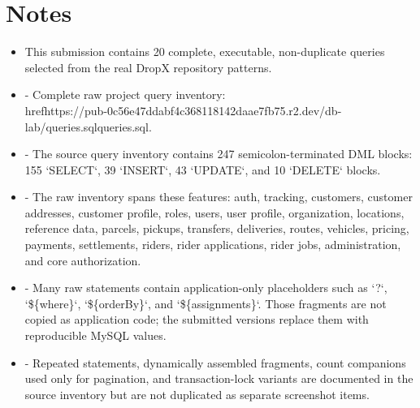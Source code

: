 \documentclass[11pt,a4paper]{article}
\begin{document}
\section{Notes}
\begin{itemize}
\item This submission contains 20 complete, executable, non-duplicate queries selected from the real DropX repository patterns.
\item - Complete raw project query inventory: \\href{https://pub-0c56e47ddabf4c368118142daae7fb75.r2.dev/db-lab/queries.sql}{queries.sql}.
\item - The source query inventory contains 247 semicolon-terminated DML blocks: 155 `SELECT`, 39 `INSERT`, 43 `UPDATE`, and 10 `DELETE` blocks.
\item - The raw inventory spans these features: auth, tracking, customers, customer addresses, customer profile, roles, users, user profile, organization, locations, reference data, parcels, pickups, transfers, deliveries, routes, vehicles, pricing, payments, settlements, riders, rider applications, rider jobs, administration, and core authorization.
\item - Many raw statements contain application-only placeholders such as `?`, `\$\{where\}`, `\$\{orderBy\}`, and `\$\{assignments\}`. Those fragments are not copied as application code; the submitted versions replace them with reproducible MySQL values.
\item - Repeated statements, dynamically assembled fragments, count companions used only for pagination, and transaction-lock variants are documented in the source inventory but are not duplicated as separate screenshot items.
\end{itemize}
\end{document}
